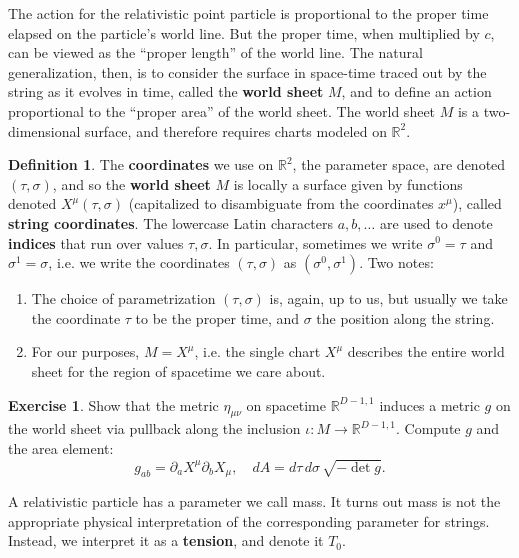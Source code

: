 \documentclass{report}
\theoremstyle{plain}
\theoremstyle{definition}
\newtheorem{definition}[theorem]{Definition}
\newtheorem{exercise}{Exercise}[section]
\theoremstyle{remark}
\newcommand{\di}{\partial}
\newcommand{\bR}{\mathbb{R}}
\begin{document}
The action for the relativistic point particle is proportional to the
proper time elapsed on the particle's world line. But the proper time,
when multiplied by $c$, can be viewed as the ``proper length'' of the
world line. The natural generalization, then, is to consider the
surface in space-time traced out by the string as it evolves in time,
called the {\bf world sheet} $M$, and to define an action proportional
to the ``proper area'' of the world sheet. The world sheet $M$ is a
two-dimensional surface, and therefore requires charts modeled on
$\bR^2$.

\begin{definition}
  The {\bf coordinates} we use on $\bR^2$, the parameter space, are
  denoted $(\tau, \sigma)$, and so the {\bf world sheet} $M$ is
  locally a surface given by functions denoted $X^\mu(\tau, \sigma)$
  (capitalized to disambiguate from the coordinates $x^\mu$), called
  {\bf string coordinates}. The lowercase Latin characters $a, b,
  \ldots$ are used to denote {\bf indices} that run over values $\tau,
  \sigma$. In particular, sometimes we write $\sigma^0 = \tau$ and
  $\sigma^1 = \sigma$, i.e. we write the coordinates $(\tau, \sigma)$
  as $(\sigma^0, \sigma^1)$. Two notes:
  \begin{enumerate}
  \item The choice of parametrization $(\tau, \sigma)$ is, again, up
    to us, but usually we take the coordinate $\tau$ to be the proper
    time, and $\sigma$ the position along the string.
  \item For our purposes, $M = X^\mu$, i.e. the single chart $X^\mu$
    describes the entire world sheet for the region of spacetime we
    care about.
  \end{enumerate}
\end{definition}

\begin{exercise}
  Show that the metric $\eta_{\mu\nu}$ on spacetime $\bR^{D-1,1}$
  induces a metric $g$ on the world sheet via pullback along the
  inclusion $\iota\colon M \to \bR^{D-1,1}$. Compute $g$ and the area
  element:
  \[ g_{ab} = \di_a X^\mu \di_b X_\mu, \quad dA = d\tau \, d\sigma \, \sqrt{-\det g}. \]
\end{exercise}

A relativistic particle has a parameter we call mass. It turns out
mass is not the appropriate physical interpretation of the
corresponding parameter for strings. Instead, we interpret it as a
{\bf tension}, and denote it $T_0$.
\end{document}
